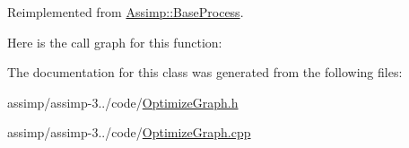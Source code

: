 Reimplemented from \hyperlink{class_assimp_1_1_base_process_aae14d0a8c5918642d4a272b7b74b5d70}{Assimp\+::\+Base\+Process}.



Here is the call graph for this function\+:




The documentation for this class was generated from the following files\+:\begin{DoxyCompactItemize}
\item 
assimp/assimp-\/3../code/\hyperlink{_optimize_graph_8h}{Optimize\+Graph.\+h}\item 
assimp/assimp-\/3../code/\hyperlink{_optimize_graph_8cpp}{Optimize\+Graph.\+cpp}\end{DoxyCompactItemize}
